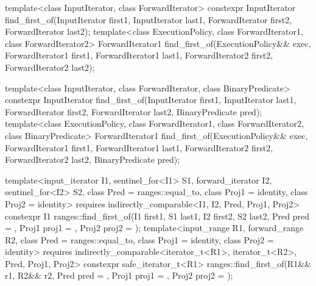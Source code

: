 %
\begin{itemdecl}
template<class InputIterator, class ForwardIterator>
  constexpr InputIterator
    find_first_of(InputIterator first1, InputIterator last1,
                  ForwardIterator first2, ForwardIterator last2);
template<class ExecutionPolicy, class ForwardIterator1, class ForwardIterator2>
  ForwardIterator1
    find_first_of(ExecutionPolicy&& exec,
                  ForwardIterator1 first1, ForwardIterator1 last1,
                  ForwardIterator2 first2, ForwardIterator2 last2);

template<class InputIterator, class ForwardIterator,
         class BinaryPredicate>
  constexpr InputIterator
    find_first_of(InputIterator first1, InputIterator last1,
                  ForwardIterator first2, ForwardIterator last2,
                  BinaryPredicate pred);
template<class ExecutionPolicy, class ForwardIterator1, class ForwardIterator2,
         class BinaryPredicate>
  ForwardIterator1
    find_first_of(ExecutionPolicy&& exec,
                  ForwardIterator1 first1, ForwardIterator1 last1,
                  ForwardIterator2 first2, ForwardIterator2 last2,
                  BinaryPredicate pred);

template<input_iterator I1, sentinel_for<I1> S1, forward_iterator I2, sentinel_for<I2> S2,
         class Pred = ranges::equal_to, class Proj1 = identity, class Proj2 = identity>
  requires indirectly_comparable<I1, I2, Pred, Proj1, Proj2>
  constexpr I1 ranges::find_first_of(I1 first1, S1 last1, I2 first2, S2 last2,
                                     Pred pred = {},
                                     Proj1 proj1 = {}, Proj2 proj2 = {});
template<input_range R1, forward_range R2,
         class Pred = ranges::equal_to, class Proj1 = identity, class Proj2 = identity>
  requires indirectly_comparable<iterator_t<R1>, iterator_t<R2>, Pred, Proj1, Proj2>
  constexpr safe_iterator_t<R1>
    ranges::find_first_of(R1&& r1, R2&& r2,
                          Pred pred = {},
                          Proj1 proj1 = {}, Proj2 proj2 = {});
\end{itemdecl}

